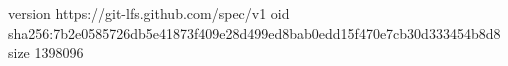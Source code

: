 version https://git-lfs.github.com/spec/v1
oid sha256:7b2e0585726db5e41873f409e28d499ed8bab0edd15f470e7cb30d333454b8d8
size 1398096
